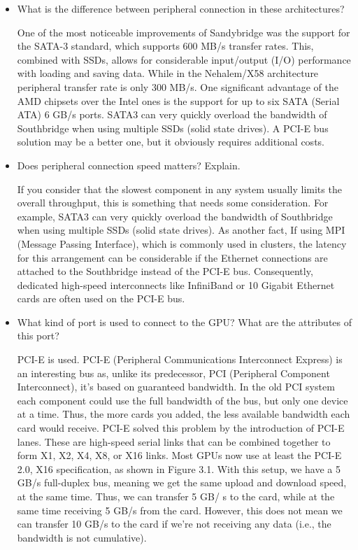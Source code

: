 \documentclass[12pt]{article}
\numberwithin{equation}{section}
\numberwithin{table}{section}
\numberwithin{figure}{section}
\begin{document}
\begin{itemize}
	\item What is the difference between peripheral connection in these architectures?

	One of the most noticeable improvements of Sandybridge was the support for the SATA-3 standard, which supports
	600 MB/s transfer rates. This, combined with SSDs, allows for considerable input/output (I/O)
	performance with loading and saving data. While in the Nehalem/X58 architecture peripheral transfer rate is only 300 MB/s. One significant advantage of the AMD chipsets over the Intel ones is the support for up to six SATA
	(Serial ATA) 6 GB/s ports. SATA3 can very
	quickly overload the bandwidth of Southbridge when using multiple SSDs (solid state drives). A PCI-E
	bus solution may be a better one, but it obviously requires additional costs. 
	
	\item Does peripheral connection speed matters? Explain.
	
	 If you consider that the slowest component in any system usually limits the overall throughput, this is something that needs some consideration. For example, SATA3 can very
	 quickly overload the bandwidth of Southbridge when using multiple SSDs (solid state drives). As another fact, If using MPI (Message Passing Interface), which is commonly used in clusters, the latency for this
	 arrangement can be considerable if the Ethernet connections are attached to the Southbridge instead
	 of the PCI-E bus. Consequently, dedicated high-speed interconnects like InfiniBand or 10 Gigabit
	 Ethernet cards are often used on the PCI-E bus.
	 
	\item What kind of port is used to connect to the GPU? What are the attributes of this port?
	
	PCI-E is used. PCI-E (Peripheral Communications Interconnect Express) is an interesting bus as, unlike its
	predecessor, PCI (Peripheral Component Interconnect), it’s based on guaranteed bandwidth. In the
	old PCI system each component could use the full bandwidth of the bus, but only one device at
	a time. Thus, the more cards you added, the less available bandwidth each card would receive. PCI-E
	solved this problem by the introduction of PCI-E lanes. These are high-speed serial links that can be
	combined together to form X1, X2, X4, X8, or X16 links. Most GPUs now use at least the PCI-E
	2.0, X16 specification, as shown in Figure 3.1. With this setup, we have a 5 GB/s full-duplex bus,
	meaning we get the same upload and download speed, at the same time. Thus, we can transfer 5 GB/
	s to the card, while at the same time receiving 5 GB/s from the card. However, this does not mean
	we can transfer 10 GB/s to the card if we’re not receiving any data (i.e., the bandwidth is not
	cumulative).
	

\end{itemize}
\end{document}
